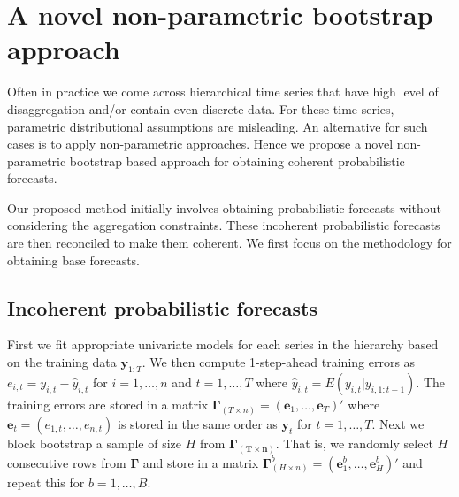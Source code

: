 \documentclass[12pt]{article}
\theoremstyle{definition}
\begin{document}


\section{A novel non-parametric bootstrap approach}\label{sec:non-para}

Often in practice we come across hierarchical time series that have high level of disaggregation and/or contain even discrete data. For these time series, parametric distributional assumptions are misleading. An alternative for such cases is to apply non-parametric approaches. Hence we propose a novel non-parametric bootstrap based approach for obtaining coherent probabilistic forecasts.

Our proposed method initially involves obtaining probabilistic forecasts without considering the aggregation constraints. These incoherent probabilistic forecasts are then reconciled to make them coherent. We first focus on the methodology for obtaining base forecasts.

\subsection{Incoherent probabilistic forecasts} \label{Subsec:Incoherent_samplePaths}
First we fit appropriate univariate models for each series in the hierarchy based on the training data $\bm{y}_{1:T}$. We then compute 1-step-ahead training errors as $e_{i,t} = y_{i,t} - \hat{y}_{i,t}$ for $i=1,\dots,n$ and $t = 1,\dots,T$ where $\hat{y}_{i,t} = E(y_{i,t}|y_{i,1:t-1})$. The training errors are stored in a matrix $\bm{\Gamma}_{(T \times n)} = (\bm{e}_1,\dots,\bm{e}_T)'$ where $\bm{e}_t = (e_{1,t},\dots,e_{n,t})$ is stored in the same order as $\bm{y}_t$ for $t=1,\dots,T$. Next we block bootstrap a sample of size $H$ from $\bm{\Gamma_{(T \times n)}}$. That is, we randomly select $H$ consecutive rows from $\bm{\Gamma}$ and store in a matrix $\bm{\Gamma}^b_{(H \times n)} = (\bm{e}^b_1,\dots,\bm{e}^b_H)'$ and repeat this for $b = 1,\dots,B$.
\end{document}
